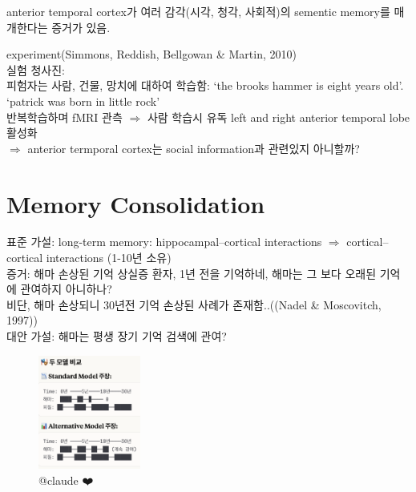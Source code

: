 \documentclass[../note.tex]{subfiles}
\begin{document}
anterior temporal cortex가 여러 감각(시각, 청각, 사회적)의 sementic memory를 매개한다는 증거가 있음.

\begin{note}{experiment(Simmons, Reddish, Bellgowan \& Martin, 2010)}\\
  실험 청사진:\\
  피험자는 사람, 건물, 망치에 대하여 학습함: `the brooks hammer is eight years old'. `patrick was born in little rock'\\
  반복학습하며 fMRI 관측 $\Longrightarrow$ 사람 학습시 유독 left and right anterior temporal lobe 활성화\\
  $\Rightarrow$ anterior termporal cortex는 social information과 관련있지 아니할까?
\end{note}

\section{Memory Consolidation}
표준 가설: long-term memory: hippocampal–cortical interactions $\Longrightarrow$ cortical–cortical interactions (1-10년 소유)\\
증거: 해마 손상된 기억 상실증 환자, 1년 전을 기억하네, 해마는 그 보다 오래된 기억에 관여하지 아니하나?\\
비단, 해마 손상되니 30년전 기억 손상된 사례가 존재함..((Nadel \& Moscovitch, 1997))\\
대안 가설: 해마는 평생 장기 기억 검색에 관여?\\

\begin{figure}[htbp]
  \centering
  \includegraphics[width=0.3\textwidth]{image/alternative_model}
  \caption{@claude ❤️ }
  \label{fig:alternative_model}
\end{figure}
\end{document}
